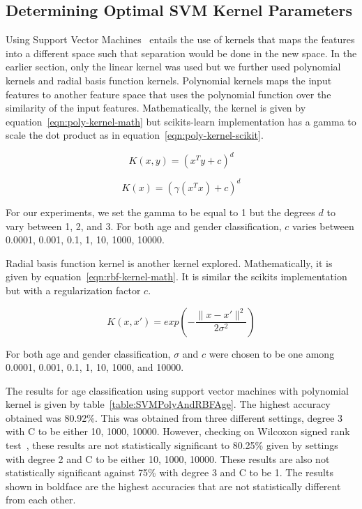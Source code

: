 \documentclass[a4paper]{llncs}
\begin{document}
\subsection{Determining Optimal SVM Kernel Parameters}
Using Support Vector Machines~\cite{cortes1995support} entails the use of kernels that maps the features into a different space such that separation would be done in the new space. In the earlier section, only the linear kernel was used but we further used polynomial kernels and radial basis function kernels. Polynomial kernels maps the input features to another feature space that uses the polynomial function over the similarity of the input features. Mathematically, the kernel is given by equation~\ref{eqn:poly-kernel-math} but scikits-learn implementation has a gamma to scale the dot product as in equation~\ref{eqn:poly-kernel-scikit}.

\begin{equation}
K(x,y) = (x^Ty + c)^d
\label{eqn:poly-kernel-math}
\end{equation}

\begin{equation}
K(x) = (\gamma(x^Tx)+c)^d
\label{eqn:poly-kernel-scikit}
\end{equation}

For our experiments, we set the gamma to be equal to 1 but the degrees $d$ to vary between 1, 2, and 3. For both age and gender classification, $c$ varies between 0.0001, 0.001, 0.1, 1, 10, 1000, 10000.   

Radial basis function kernel is another kernel explored. Mathematically, it is given by equation~\ref{eqn:rbf-kernel-math}. It is similar the scikits implementation but with a regularization factor $c$. 

\begin{equation}
K(x,x')= exp\left( -\frac{\parallel x-x'\parallel^2}{2\sigma^2} \right)
\label{eqn:rbf-kernel-math}
\end{equation} 

For both age and gender classification, $\sigma$ and $c$ were chosen to be one among 0.0001, 0.001, 0.1, 1, 10, 1000, and 10000.

The results for age classification using support vector machines with polynomial kernel is given by table~\ref{table:SVMPolyAndRBFAge}. The highest accuracy obtained was 80.92\%. This was obtained from three different settings, degree 3 with C to be either 10, 1000, 10000. However, checking on Wilcoxon signed rank test~\cite{wilcoxon1945individual}, these results are not statistically significant to 80.25\% given by settings with degree 2 and C to be either 10, 1000, 10000. These results are also not statistically significant against 75\% with degree 3 and C to be 1. The results shown in boldface are the highest accuracies that are not statistically different from each other. 
\end{document}
